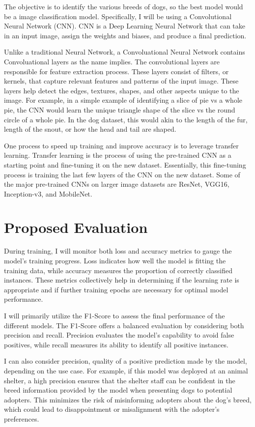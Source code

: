 \documentclass[11pt]{article}
\begin{document}
The objective is to identify the various breeds of dogs, so the best model would be a image classification model. Specifically, I will be using a Convolutional Neural Network (CNN). CNN is a Deep Learning Neural Network that can take in an input image, assign the weights and biases, and produce a final prediction.  

Unlike a traditional Neural Network, a Convoluational Neural Network contains Convoluational layers as the name implies. The convolutional layers are responsible for feature extraction process. These layers consist of filters, or kernels, that capture relevant features and patterns of the input image. These layers help detect the edges, textures, shapes, and other aspects unique to the image. For example, in a simple example of identifying a slice of pie vs a whole pie, the CNN would learn the unique triangle shape of the slice vs the round circle of a whole pie. In the dog dataset, this would akin to the length of the fur, length of the snout, or how the head and tail are shaped. 

One process to speed up training and improve accuracy is to leverage transfer learning. Transfer learning is the process of using the pre-trained CNN as a starting point and fine-tuning it on the new dataset. Essentially, this fine-tuning process is training the last few layers of the CNN on the new dataset. Some of the major pre-trained CNNs on larger image datasets are ResNet, VGG16, Inception-v3, and MobileNet.

\section{Proposed Evaluation}   

During training, I will monitor both loss and accuracy metrics to gauge the model's training progress. Loss indicates how well the model is fitting the training data, while accuracy measures the proportion of correctly classified instances. These metrics collectively help in determining if the learning rate is appropriate and if further training epochs are necessary for optimal model performance.

I will primarily utilize the F1-Score to assess the final performance of the different models. The F1-Score offers a balanced evaluation by considering both precision and recall. Precision evaluates the model's capability to avoid false positives, while recall measures its ability to identify all positive instances. 

I can also consider precision, quality of a positive prediction made by the model, depending on the use case. For example, if this model was deployed at an animal shelter, a high precision ensures that the shelter staff can be confident in the breed information provided by the model when presenting dogs to potential adopters. This minimizes the risk of misinforming adopters about the dog's breed, which could lead to disappointment or misalignment with the adopter's preferences.



\end{document}
